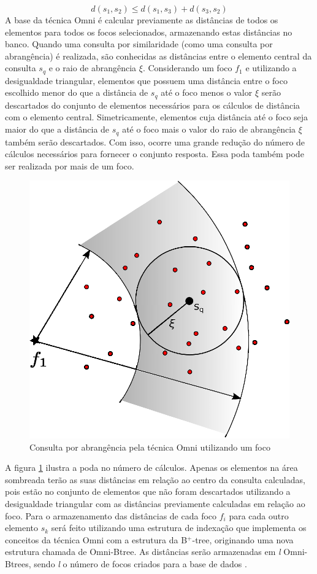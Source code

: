 \begin{equation} \label{eq:destri}
		d(s_1,s_2) \leq d(s_1,s_3) + d(s_3,s_2)
\end{equation}
\newline
A base da técnica Omni é calcular previamente as distâncias de todos os elementos para todos os focos selecionados, armazenando estas distâncias no banco. Quando uma consulta por similaridade
(como uma consulta por abrangência) é realizada, são conhecidas as distâncias entre o elemento central da consulta $s_q$ e o raio de abrangência $\xi$. Considerando um foco ${f_1}$ e utilizando
a desigualdade triangular, elementos que possuem uma distância entre o foco escolhido menor do que a distância de $s_q$ até o foco menos o valor $\xi$ serão descartados do conjunto de elementos necessários para
os cálculos de distância com o elemento central. Simetricamente, elementos cuja distância até o foco seja maior do que a distância de $s_q$ até o foco mais o valor do raio de abrangência $\xi$ também
serão descartados. Com isso, ocorre uma grande redução do número de cálculos necessários para fornecer o conjunto resposta. Essa poda também pode ser realizada por mais de um foco.

\begin{figure}[H]
\centering
\captionsetup{width=0.50\textwidth, font=footnotesize, textfont=bf}
\includegraphics[width=.4\textwidth]{dados/figuras/rg_omni_1.eps}
\caption{Consulta por abrangência pela técnica Omni utilizando um foco}
\label{fig:rqomni1}
\end{figure}


A figura \ref{fig:rqomni1} ilustra a poda no número de cálculos. Apenas os elementos na área sombreada terão as suas distâncias em relação ao centro da consulta calculadas, pois estão no
conjunto de elementos que não foram descartados utilizando a desigualdade triangular com as distâncias previamente calculadas em relação ao foco. Para o armazenamento das distâncias de cada foco ${f_i}$ para cada outro elemento $s_k$ será feito utilizando uma estrutura de indexação que implementa os conceitos da técnica Omni com a 
estrutura da B$^+$-tree, originando uma nova estrutura chamada de Omni-Btree. As distâncias serão armazenadas em \textit{l} Omni-Btrees, sendo \textit{l} o número de focos criados para
a base de dados \cite{Traina2001}.

